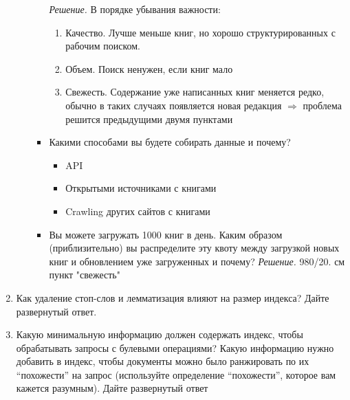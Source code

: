 \begin{enumerate}
\begin{enumerate}
\begin{itemize}
			\textit{Решение. }В порядке убывания важности:
			\begin{enumerate}
				\item Качество. Лучше меньше книг, но хорошо структурированных с рабочим поиском.
				\item Объем. Поиск ненужен, если книг мало
				\item Свежесть. Содержание уже написанных книг меняется редко, обычно в таких случаях появляется новая редакция $\Rightarrow$ проблема решится предыдущими двумя пунктами
			\end{enumerate}
			\item Какими способами вы будете собирать данные и почему?
			\begin{itemize}
				\item API
				\item Открытыми источниками с книгами
				\item Crawling других сайтов с книгами
			\end{itemize}
			\item Вы можете загружать 1000 книг в день. Каким образом (приблизительно) вы 
			распределите эту квоту между загрузкой новых книг и обновлением уже загруженных и
			почему?
			\textit{Решение.} 980/20. см пункт "свежесть"
		\end{itemize}
	\end{enumerate}
	
	\item  Как удаление стоп-слов и лемматизация влияют на размер индекса? Дайте	
	развернутый ответ.
	
	\item Какую минимальную информацию должен содержать индекс, чтобы обрабатывать запросы с 
	булевыми операциями? Какую информацию нужно добавить в индекс, чтобы документы можно было 
	ранжировать по их “похожести” на запрос (используйте определение “похожести”, которое вам 
	кажется разумным). Дайте развернутый ответ
\end{enumerate}
